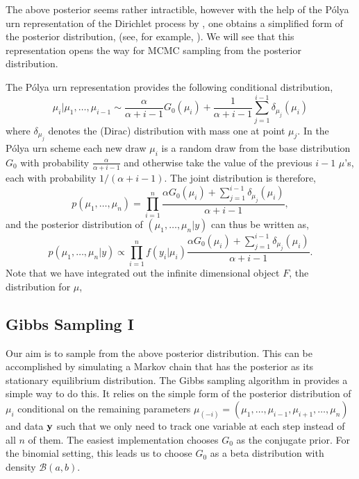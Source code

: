 \documentclass[12pt]{amsart}
\begin{document}
{The above posterior seems rather intractible, however with the help of the P\'olya urn 
representation of the Dirichlet process by , one obtains a simplified 
form of the posterior distribution, (see, for example, ). We will see that 
this representation opens the way for MCMC sampling from the posterior distribution.

The P\'olya urn representation provides the following conditional distribution, 
\begin{equation} \label{eq1}
\mu_{i} | \mu_{1}, \dots, \mu_{i-1} \sim \frac{\alpha}{\alpha +i-1}G_{0}(\mu_{i}) + \frac{1}{\alpha+i-1} \sum_{j=1}^{i-1} \delta_{\mu_{j}}(\mu_{i})
\end{equation}
where $\delta_{\mu_{j}}$ denotes the (Dirac) distribution with mass one at point $\mu_{j}$. 
In the P\'olya urn scheme each new draw $\mu_{i}$ is a random draw from the 
base distribution $G_{0}$ with probability $\frac{\alpha}{\alpha+i-1}$ and 
otherwise take the value of the previous $i-1$ $\mu$'s, each with probability 
$1/(\alpha+i-1)$. The joint distribution is therefore,  
\[
p(\mu_{1}, \dots, \mu_{n})= \prod_{i=1}^{n} 
\frac{\alpha G_{0}(\mu_{i})+\sum_{j=1}^{i-1}\delta_{\mu_{j}}(\mu_{i})}{\alpha+i-1},
\]
and the posterior distribution of $(\mu_{1}, \dots, \mu_{n} | y)$ can thus be written as,
\begin{equation} \label{post}
p(\mu_{1}, \dots, \mu_{n} |y) \propto \prod_{i=1}^{n} f(y_{i} | \mu_{i})  \frac{\alpha G_{0}(\mu_{i}) + \sum_{j=1}^{i-1}\delta_{\mu_{j}}(\mu_{i})}{\alpha + i-1}. 
\end{equation}
Note that we have integrated out the infinite dimensional object $F$, the distribution 
for  $\mu$,  

\subsection{Gibbs Sampling I}
Our aim is to sample from the above posterior distribution. This can be accomplished by 
simulating a Markov chain that has the posterior as its stationary equilibrium distribution. 
The Gibbs sampling algorithm in  provides a simple way to do this. 
It relies on the simple form of the posterior distribution of $\mu_{i}$ conditional on the 
remaining parameters $\mu_{(-i)} = (\mu_{1}, \dots, \mu_{i-1}, \mu_{i+1}, \dots, \mu_{n})$ 
and data $\bf{y}$ such that we only need to track one variable at each step instead of all $n$ of them.
The easiest implementation chooses $G_{0}$ as the conjugate prior. 
For the binomial setting, this leads us to choose $G_{0}$ as a beta distribution with 
density $\mathcal{B}(a,b)$. 

}
\end{document}
